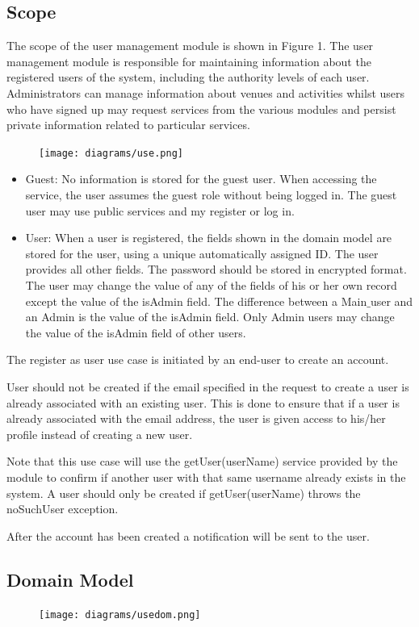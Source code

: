 \documentclass[12pt]{article}
\begin{document}
\subsection{Scope}
The scope of the user management module is shown in Figure 1. The user management module is responsible for maintaining information about the registered users of the system, including the authority levels of each user. Administrators can manage information about venues and activities whilst users who have signed up may request services from the various modules and persist private information related to particular  services.
\begin{figure}[h]
\centering
\texttt{[image: diagrams/use.png]}
\end{figure}
\begin{itemize}
\item Guest: No information is stored for the guest user. When accessing the service, the user assumes the guest role without being logged in. The guest user may use public services and my register or log in.
\item User: When a user is registered, the fields shown in the domain model are stored for the user, using a unique automatically assigned ID. The user provides all other fields. The password should be stored in encrypted format. The user may change the value of any of the fields of his or her own record except the value of the isAdmin field.  The  difference between a Main$\_$user and an Admin is the value of the isAdmin field. Only Admin users may change the value of the isAdmin field of other users.

\end{itemize}

The register as user  use case is initiated by an end-user to create an account. 

User should not be created if the email specified in the request to create a user is already associated with an existing user. This is done to ensure that if a user is already associated with the email address, the user is given access to his/her profile instead of creating a new user.

Note that this use case will use the getUser(userName) service provided by the module to conﬁrm if another user with that same username already exists in the system. A user should only be created if getUser(userName)  throws the noSuchUser exception.  

After the account has been created a notiﬁcation will be sent to the user.
\subsection{Domain Model}
\begin{figure}[h]
\centering
\texttt{[image: diagrams/usedom.png]}
\end{figure}
\end{document}

